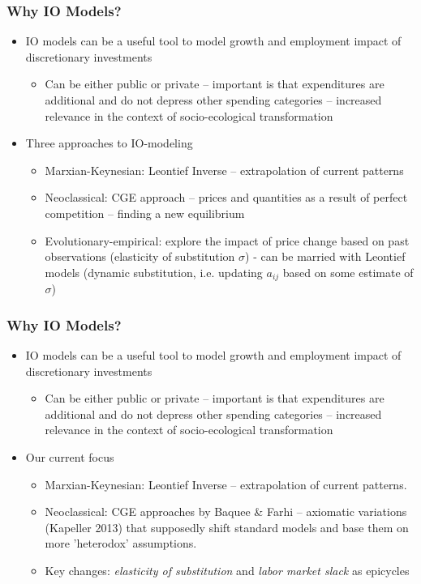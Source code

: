 \documentclass[utf8,aspectratio=169,ngerman,english]{beamer}
\begin{document}
\begin{frame}
\frametitle{Why IO Models?}

\begin{itemize}
  \item IO models can be a useful tool to model growth and employment impact of discretionary investments
  \begin{itemize}
      \item Can be either public or private – important is that expenditures are additional and do not depress other spending categories – increased relevance in the context of socio-ecological transformation
  \end{itemize}
  
  \item Three approaches to IO-modeling
 \begin{itemize}
      \item Marxian-Keynesian: Leontief Inverse – extrapolation of current patterns
      \item Neoclassical: CGE approach – prices and quantities as a result of perfect competition – finding a new equilibrium
      \item Evolutionary-empirical: explore the impact of price change based on past observations (elasticity of substitution $\sigma$) - can be married with Leontief models (dynamic substitution, i.e. updating $a_{ij}$ based on some estimate of $\sigma$)
    \end{itemize}
\end{itemize}
\end{frame}

\begin{frame}
\frametitle{Why IO Models?}

\begin{itemize}
  \item IO models can be a useful tool to model growth and employment impact of discretionary investments
  \begin{itemize}
      \item Can be either public or private – important is that expenditures are additional and do not depress other spending categories – increased relevance in the context of socio-ecological transformation
  \end{itemize}
  
  \item Our current focus
 \begin{itemize}
      \item Marxian-Keynesian: Leontief Inverse – extrapolation of current patterns.
      \item Neoclassical: CGE approaches by Baquee \& Farhi – axiomatic variations (Kapeller 2013) that supposedly shift standard models and base them on more 'heterodox' assumptions.
      \item Key changes: \textit{elasticity of substitution} and \textit{labor market slack} as epicycles
    \end{itemize}
\end{itemize}
\end{frame}
\end{document}
